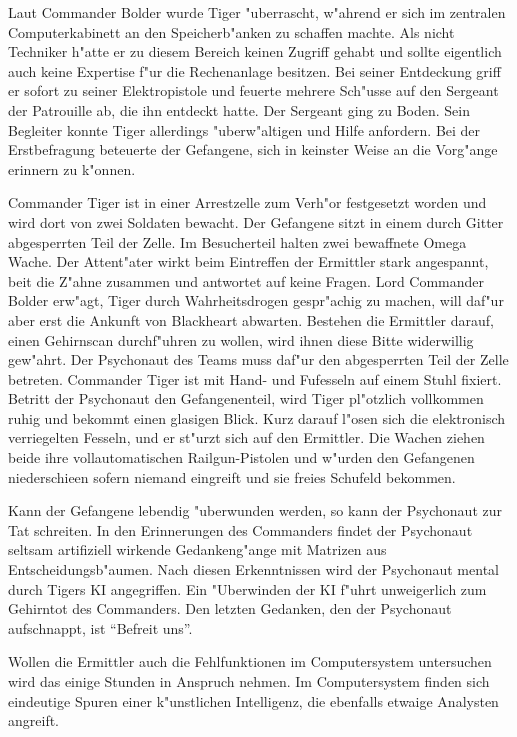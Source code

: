 Laut Commander Bolder wurde Tiger "uberrascht, w"ahrend er sich im zentralen Computerkabinett an den Speicherb"anken zu schaffen machte. Als nicht Techniker h"atte er zu diesem Bereich keinen Zugriff gehabt und sollte eigentlich auch  keine Expertise f"ur die Rechenanlage besitzen. Bei seiner Entdeckung griff er sofort zu seiner Elektropistole und feuerte mehrere Sch"usse auf den Sergeant der Patrouille ab, die ihn entdeckt hatte. Der Sergeant ging zu Boden. Sein Begleiter konnte Tiger allerdings "uberw"altigen und Hilfe anfordern. Bei der Erstbefragung beteuerte der Gefangene, sich in keinster Weise an die Vorg"ange erinnern zu k"onnen.

Commander Tiger ist in einer Arrestzelle zum Verh"or festgesetzt worden und wird dort von zwei Soldaten bewacht. Der Gefangene sitzt in einem durch Gitter abgesperrten Teil der Zelle. Im Besucherteil halten zwei bewaffnete Omega Wache. Der Attent"ater wirkt beim Eintreffen der Ermittler stark angespannt, bei\3t die Z"ahne zusammen und antwortet auf keine Fragen. Lord Commander Bolder erw"agt, Tiger durch Wahrheitsdrogen gespr"achig zu machen, will daf"ur aber erst die Ankunft von Blackheart abwarten. Bestehen die Ermittler darauf, einen Gehirnscan durchf"uhren zu wollen, wird ihnen diese Bitte widerwillig gew"ahrt. Der Psychonaut des Teams muss daf"ur den abgesperrten Teil der Zelle betreten. Commander Tiger ist mit Hand- und Fu\3fesseln auf einem Stuhl fixiert. Betritt der Psychonaut den Gefangenenteil, wird Tiger pl"otzlich vollkommen ruhig und bekommt einen glasigen Blick. Kurz darauf l"osen sich die elektronisch verriegelten Fesseln, und er st"urzt sich auf den Ermittler. Die Wachen ziehen beide ihre vollautomatischen Railgun-Pistolen und w"urden den Gefangenen niederschie\3en sofern niemand eingreift und sie freies Schu\3feld bekommen.

Kann der Gefangene lebendig "uberwunden werden, so kann der Psychonaut zur Tat schreiten. In den Erinnerungen des Commanders findet der Psychonaut seltsam artifiziell wirkende Gedankeng"ange mit Matrizen aus Entscheidungsb"aumen. Nach diesen Erkenntnissen wird der Psychonaut mental durch Tigers KI angegriffen. Ein "Uberwinden der KI f"uhrt unweigerlich zum Gehirntot des Commanders. Den letzten Gedanken, den der Psychonaut aufschnappt, ist "`Befreit uns"'.

Wollen die Ermittler auch die Fehlfunktionen im Computersystem untersuchen wird das einige Stunden in Anspruch nehmen. Im Computersystem finden sich eindeutige Spuren einer k"unstlichen Intelligenz, die ebenfalls etwaige Analysten angreift.

